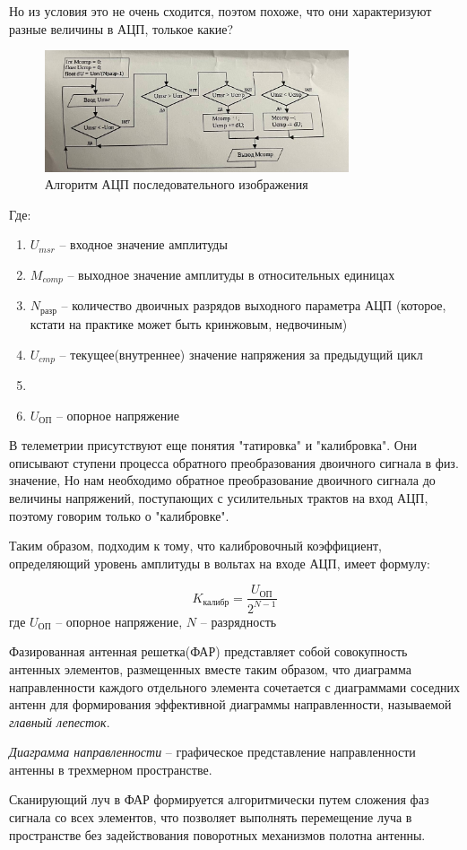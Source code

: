 \documentclass[14pt, report]{extarticle}
\begin{document}
\par Но из условия это не очень сходится, поэтом похоже, что они характеризуют разные величины в АЦП, толькое какие?

\newpage

\begin{figure}[h]
  \centering
  \includegraphics[width=0.8\textwidth]{../alg.jpg}
  \caption{Алгоритм АЦП последовательного изображения}
\end{figure}
\par Где:
\begin{enumerate}
  \item $U_{msr}$ -- входное значение амплитуды
  \item $M_{comp}$ -- выходное значение амплитуды в относительных единицах
  \item $N_{\text{разр}}$ -- количество двоичных разрядов выходного параметра АЦП
  (которое, кстати на практике может быть кринжовым, недвочиным)
  \item $U_{cmp}$ -- текущее(внутреннее) значение напряжения за предыдущий цикл
  \item \item $U_{\text{ОП}}$ -- опорное напряжение
\end{enumerate}

В телеметрии присутствуют еще понятия "татировка" и "калибровка". 
Они описывают ступени процесса обратного преобразования двоичного сигнала в физ. значение,
Но нам необходимо обратное преобразование двоичного сигнала до величины напряжений, 
поступающих с усилительных трактов на вход АЦП, поэтому говорим только о "калибровке".

\newpage
\par Таким образом, подходим к тому, что калибровочный коэффициент,
определяющий уровень амплитуды в вольтах на входе АЦП, имеет формулу:

$$
K_{\text{калибр}} = \frac{U_{\text{ОП}}}{2^{N-1}}
$$
где $U_{\text{ОП}}$ -- опорное напряжение, $\mathit{N}$ -- разрядность 

\par Фазированная антенная решетка(ФАР) представляет собой 
совокупность антенных элементов, размещенных вместе таким образом,
 что диаграмма направленности каждого отдельного элемента
сочетается с диаграммами соседних антенн для формирования 
эффективной диаграммы направленности, называемой \textit{главный лепесток}.
\par\textit{Диаграмма направленности} -- графическое представление
 направленности антенны в трехмерном пространстве. 
\par Сканирующий луч в ФАР формируется алгоритмически 
путем сложения фаз сигнала со всех элементов,
что позволяет выполнять перемещение луча в пространстве 
без задействования поворотных механизмов полотна антенны.
\end{document}
